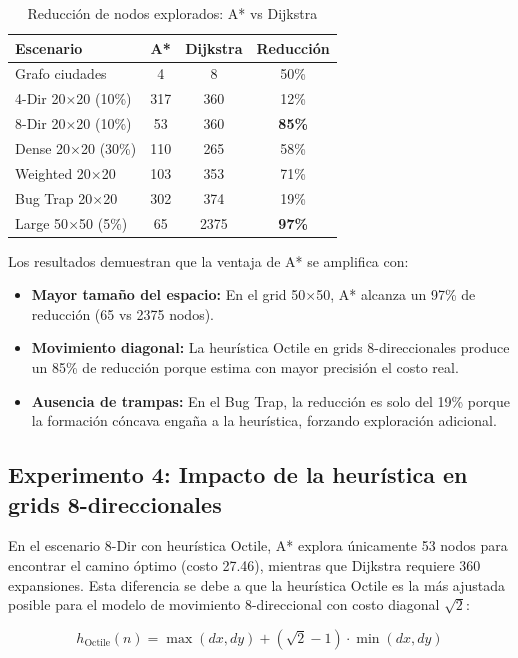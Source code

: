 \begin{table}[H]
\centering
\caption{Reducción de nodos explorados: A* vs Dijkstra}
\label{tab:efficiency}
\renewcommand{\arraystretch}{1.3}
\begin{tabular}{@{}lccc@{}}
\toprule
\textbf{Escenario} & \textbf{A*} & \textbf{Dijkstra} & \textbf{Reducción} \\
\midrule
Grafo ciudades & 4 & 8 & 50\% \\
4-Dir 20$\times$20 (10\%) & 317 & 360 & 12\% \\
8-Dir 20$\times$20 (10\%) & 53 & 360 & \textbf{85\%} \\
Dense 20$\times$20 (30\%) & 110 & 265 & 58\% \\
Weighted 20$\times$20 & 103 & 353 & 71\% \\
Bug Trap 20$\times$20 & 302 & 374 & 19\% \\
Large 50$\times$50 (5\%) & 65 & 2375 & \textbf{97\%} \\
\bottomrule
\end{tabular}
\end{table}

Los resultados demuestran que la ventaja de A* se amplifica con:
\begin{itemize}
    \item \textbf{Mayor tamaño del espacio:} En el grid 50$\times$50, A* alcanza un 97\% de reducción (65 vs 2375 nodos).
    \item \textbf{Movimiento diagonal:} La heurística Octile en grids 8-direccionales produce un 85\% de reducción porque estima con mayor precisión el costo real.
    \item \textbf{Ausencia de trampas:} En el Bug Trap, la reducción es solo del 19\% porque la formación cóncava engaña a la heurística, forzando exploración adicional.
\end{itemize}

\subsection{Experimento 4: Impacto de la heurística en grids 8-direccionales}

En el escenario 8-Dir con heurística Octile, A* explora únicamente 53 nodos para encontrar el camino óptimo (costo 27.46), mientras que Dijkstra requiere 360 expansiones. Esta diferencia se debe a que la heurística Octile es la más ajustada posible para el modelo de movimiento 8-direccional con costo diagonal $\sqrt{2}$:

\begin{equation}
    h_{\text{Octile}}(n) = \max(dx, dy) + (\sqrt{2} - 1) \cdot \min(dx, dy)
\end{equation}

